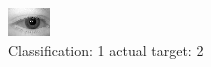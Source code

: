 \begin{figure}[h!]
\begin{center}
\includegraphics[width=0.60\columnwidth]{figures/ID364_class_1_target_2.png}
\end{center}
\caption{ Classification: 1 actual target: 2}
\label{fig:ID364_class_1_target_2}
\end{figure}
